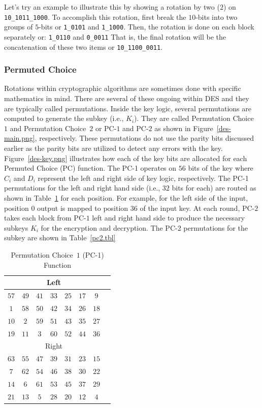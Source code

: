 \documentclass{article}
\begin{document}
Let's try an example to
illustrate this by showing a rotation by two ($2$) on \verb!10_1011_1000!.
To accomplish this rotation, first break the $10$-bits into two groups
of $5$-bits or \verb!1_0101! and \verb!1_1000!.   Then, the rotation
is done on each block separately or:  \verb!1_0110! and \verb!0_0011!
That is, the final rotation will be the concatenation of these two
items or \verb!10_1100_0011!.

\subsubsection{Permuted Choice}

Rotations within cryptographic algorithms are sometimes done with
specific mathematics in mind.  There are several of these ongoing
within DES and they are typically called permutations.  Inside the key
logic, several permutations are computed to generate the
subkey (i.e., $K_i$).  They are called Permutation
Choice~$1$ and Permutation Choice~$2$ or PC-$1$ and PC-$2$ as shown in
Figure~\ref{des-main.png}, respectively.  These
permutations do not use the parity bits discussed earlier as the
parity bits are utilized to detect any errors with the key.
Figure~\ref{des-key.png} illustrates how each of the key bits 
are allocated for each Permuted Choice (PC) function.
The PC-1
operates on $56$ bits of the key where $C_i$ and $D_i$ represent the
left and right side of key logic, respectively.
The PC-1 permutations for the left and right hand side (i.e., $32$
bits for each) are routed as shown in
Table~\ref{pc1.tbl} for each position.   For example, for the left
side of the input, position $0$ output is mapped to position $36$ of
the input key.  
At each round, PC-$2$ takes each
block from PC-$1$ left and right hand side to produce the necessary
subkeys $K_i$ for the encryption and decryption.  The PC-2
permutations for the subkey are shown in
Table~\ref{pc2.tbl}
\begin{table} [b!]
  \centering
\begin{tabular} {|c|c|c|c|c|c|c|c|} \hline
  \multicolumn{7}{|c|}{Left} \\ \hline
  $57$ & $49$ & $41$ & $33$ & $25$ & $17$ & $9$ \\ \hline
  $1$ & $58$ & $50$ & $42$ & $34$ & $26$ & $18$ \\ \hline
  $10$ & $2$ & $59$ & $51$ & $43$ & $35$ & $27$ \\ \hline
  $19$ & $11$ & $3$ & $60$ & $52$ & $44$ & $36$ \\ \hline
  \multicolumn{7}{|c|}{Right} \\ \hline
  $63$ & $55$ & $47$ & $39$ & $31$ & $23$ & $15$ \\ \hline
  $7$ & $62$ & $54$ & $46$ & $38$ & $30$ & $22$ \\ \hline
  $14$ & $6$ & $61$ & $53$ & $45$ & $37$ & $29$ \\ \hline
  $21$ & $13$ & $5$ & $28$ & $20$ & $12$ & $4$ \\ \hline  
\end{tabular}
\caption{Permutation Choice~$1$ (PC-1) Function\protect\footnotemark}
\label{pc1.tbl}
\end{table}
\end{document}
